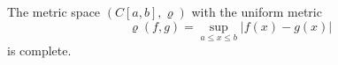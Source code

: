 The metric space $(C[a, b], \varrho)$ with the uniform metric
$$
\varrho(f, g) = \sup_{a \leq x \leq b} |f(x) - g(x)|
$$
is complete.

